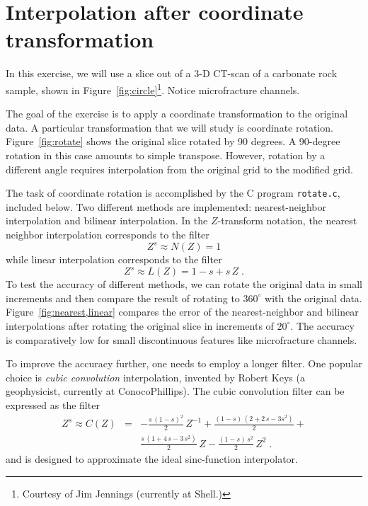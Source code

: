 \newpage

\section{Interpolation after coordinate transformation}

In this exercise, we will use a slice out of a 3-D CT-scan of a
carbonate rock sample, shown in
Figure~\ref{fig:circle}\footnote{Courtesy of Jim Jennings
  (currently at Shell.)}. Notice microfracture channels.


The goal of the exercise is to apply a coordinate transformation to
the original data. A particular transformation that we will study is
coordinate rotation. Figure~\ref{fig:rotate} shows the original slice
rotated by 90 degrees. A 90-degree rotation in this case amounts to
simple transpose. However, rotation by a different angle requires
interpolation from the original grid to the modified grid.

The task of coordinate rotation is accomplished by the C program
\texttt{rotate.c}, included below. Two different methods are implemented: 
nearest-neighbor interpolation and bilinear interpolation. In the
$Z$-transform notation, the nearest neighbor interpolation corresponds
to the filter
\begin{equation}
\label{eq:nearest}
Z^s \approx N(Z) = 1
\end{equation}
while linear interpolation corresponds to the filter
\begin{equation}
\label{eq:linear}
Z^s \approx L(Z) = 1-s + s\,Z\;.
\end{equation}
To test the accuracy of different methods, we can rotate the original
data in small increments and then compare the result of rotating to
$360^{\circ}$ with the original data. Figure~\ref{fig:nearest,linear}
compares the error of the nearest-neighbor and bilinear interpolations
after rotating the original slice in increments of $20^{\circ}$. The
accuracy is comparatively low for small discontinuous features like
microfracture channels.

To improve the accuracy further, one needs to employ a longer
filter. One popular choice is \emph{cubic convolution} interpolation,
invented by Robert Keys (a geophysicist, currently at ConocoPhillips).
The cubic convolution filter can be expressed as the filter
\begin{eqnarray}
\nonumber
Z^s \approx C(Z) & = & -\frac{s\,(1-s)^2}{2}\,Z^{-1} + \frac{(1-s)\,(2 + 2\,s - 3 s^2)}{2} + \\
&  & \frac{s\,(1 + 4\,s - 3\,s^2)}{2}\,Z - \frac{(1-s)\,s^2}{2}\,Z^2\;.
\label{eq:cubic}
\end{eqnarray}
and is designed to approximate the ideal sinc-function interpolator.

